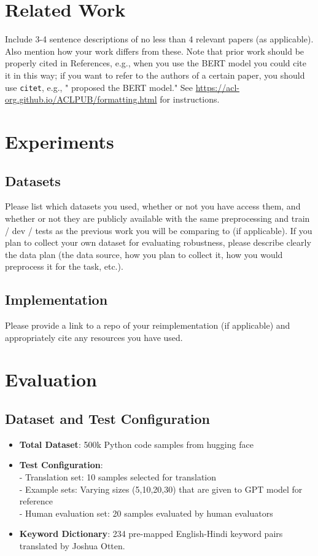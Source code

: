 \documentclass[11pt,a4paper]{article}
\begin{document}
\section{Related Work}
Include 3-4 sentence descriptions of no less than 4 relevant papers (as applicable). Also mention how your work differs from these. Note that prior work should be properly cited in References, e.g., when you use the BERT model \cite{devlin2019bert} you could cite it in this way; if you want to refer to the authors of a certain paper, you should use \texttt{citet}, e.g., "\citet{devlin2019bert} proposed the BERT model." See \url{https://acl-org.github.io/ACLPUB/formatting.html} for instructions.

\section{Experiments}

\subsection{Datasets}
Please list which datasets you used, whether or not you have access them, and whether or not they are publicly available with the same preprocessing and train / dev / tests as the previous work you will be comparing to (if applicable). If you plan to collect your own dataset for evaluating robustness, please describe clearly the data plan (the data source, how you plan to collect it, how you would preprocess it for the task, etc.).

\subsection{Implementation} 
Please provide a link to a repo of your reimplementation (if applicable) and appropriately cite any resources you have used.

\section{Evaluation}
\subsection{Dataset and Test Configuration}
\begin{itemize}[itemsep=0pt, topsep=0pt]
    \item \textbf{Total Dataset}: 500k Python code samples from hugging face \cite{jtatman2021python}
    \item \textbf{Test Configuration}:\\ 
    - Translation set: 10 samples selected for translation\\
    - Example sets: Varying sizes (5,10,20,30) that are given to GPT model for reference\\ 
    - Human evaluation set: 20 samples evaluated by human evaluators
    \item \textbf{Keyword Dictionary}: 234 pre-mapped English-Hindi keyword pairs translated by Joshua Otten.
\end{itemize}
\end{document}
